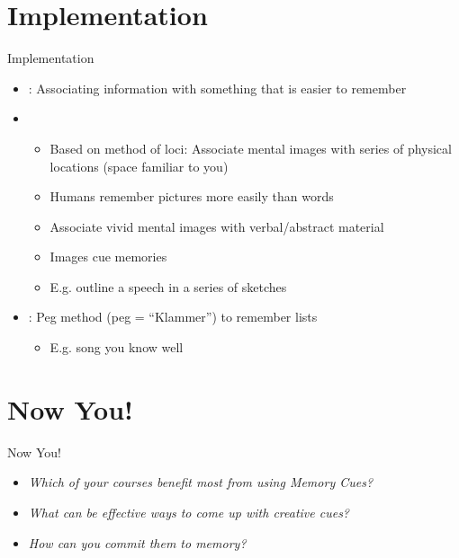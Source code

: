 \documentclass{ercisbeamer}
\begin{document}
\section{Implementation}
\begin{frame}{Implementation}
    \begin{tbox}
        \begin{itemize}
            \item {}: Associating information with something that is easier to remember
            \item {}
            \begin{itemize}
                \item Based on method of loci: Associate mental images with series of physical locations (space familiar to you)
                \item Humans remember pictures more easily than words
                \item Associate vivid mental images with verbal/abstract material
                \item Images cue memories
                \item E.g. outline a speech in a series of sketches
            \end{itemize}
            \item {}: Peg method (peg = ``Klammer'') to remember lists
            \begin{itemize}
                \item E.g. song you know well
            \end{itemize}
        \end{itemize}
    \end{tbox}
\end{frame}
\setbgimage{}

\section{Now You!}
\begin{frame}{Now You!}
    \begin{itemize}
        \item \emph{Which of your courses benefit most from using Memory Cues? }
        \item \emph{What can be effective ways to come up with creative cues?}
        \item \emph{How can you commit them to memory?}
    \end{itemize}
\end{frame}



\sources
\end{document}
